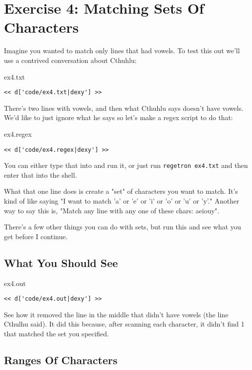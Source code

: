 \chapter{Exercise 4: Matching Sets Of Characters}

Imagine you wanted to match only lines that had vowels.  To test this out
we'll use a contrived conversation about Cthuhlu:

\begin{code}{ex4.txt}
\begin{Verbatim}
<< d['code/ex4.txt|dexy'] >>
\end{Verbatim}
\end{code}

There's two lines with vowels, and then what Cthuhlu says doesn't have vowels.
We'd like to just ignore what he says so let's make a regex script to do that:

\begin{code}{ex4.regex}
\begin{Verbatim}
<< d['code/ex4.regex|dexy'] >>
\end{Verbatim}
\end{code}

You can either type that into  and run it, or just run
\verb|regetron ex4.txt| and then enter that into the shell.

What that one line does is create a "set" of characters you want to match.
It's kind of like saying "I want to match 'a' or 'e' or 'i' or 'o' or 'u' or 'y'."
Another way to say this is, "Match any line with any one of these chars: aeiouy".

There's a few other things you can do with sets, but run this and see what you
get before I continue.

\section{What You Should See}

\begin{code}{ex4.out}
\begin{Verbatim}
<< d['code/ex4.out|dexy'] >>
\end{Verbatim}
\end{code}

See how it removed the line in the middle that didn't have vowels (the
line Cthulhu said).  It did this because, after scanning each character,
it didn't find 1 that matched the set you specified.

\section{Ranges Of Characters}


